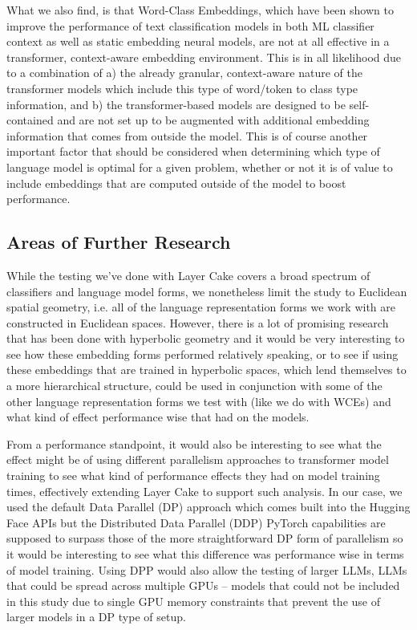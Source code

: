 \documentclass[final]{clv2025}
\begin{document}
What we also find, is that Word-Class Embeddings, which have been shown to improve the performance of text classification models in both ML classifier context as well as static embedding neural models, are not at all effective in a transformer, context-aware embedding environment. This is in all likelihood due to a combination of a) the already granular, context-aware nature of the transformer models which include this type of word/token to class type information, and b) the transformer-based models are designed to be self-contained and are not set up to be augmented with additional embedding information that comes from outside the model. This is of course another important factor that should be considered when determining which type of language model is optimal for a given problem, whether or not it is of value to include embeddings that are computed outside of the model to boost performance.

\subsection{Areas of Further Research }

While the testing we’ve done with Layer Cake covers a broad spectrum of classifiers and language model forms, we nonetheless limit the study to Euclidean spatial geometry, i.e. all of the language representation forms we work with are constructed in Euclidean spaces. However, there is a lot of promising research that has been done with hyperbolic geometry \cite{tifrea} \cite{leimeister2019skip} \cite{valentino} and it would be very interesting to see how these embedding forms performed relatively speaking, or to see if using these embeddings that are trained in hyperbolic spaces, which lend themselves to a more hierarchical structure, could be used in conjunction with some of the other language representation forms we test with (like we do with WCEs) and what kind of effect performance wise that had on the models.

From a performance standpoint, it would also be interesting to see what the effect might be of using different parallelism approaches to transformer model training to see what kind of performance effects they had on model training times, effectively extending Layer Cake to support such analysis. In our case, we used the default Data Parallel (DP) approach which comes built into the Hugging Face APIs but the Distributed Data Parallel (DDP) PyTorch capabilities are supposed to surpass those of the more straightforward DP form of parallelism so it would be interesting to see what this difference was performance wise in terms of model training. Using DPP would also allow the testing of larger LLMs, LLMs that could be spread across multiple GPUs – models that could not be included in this study due to single GPU memory constraints that prevent the use of larger models in a DP type of setup. 
\end{document}
